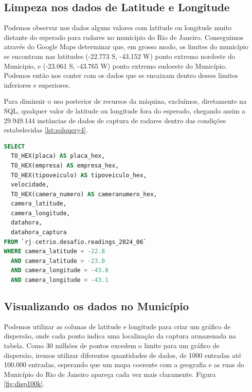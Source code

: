 \documentclass{article}
\begin{document}
\subsection{Limpeza nos dados de Latitude e Longitude}

Podemos observar nos dados alguns valores com latitude ou longitude muito distante do esperado para radares no município do Rio de Janeiro. Conseguimos através do Google Maps determinar que, em grosso modo, os limites do município se encontram nas latitudes (-22.773 S, -43.152 W) ponto extremo nordeste do Municipio, e (-23.061 S, -43.765 W) ponto extremo sudoeste do Município. Podemos então nos conter com os dados que se encaixam dentro desses limites inferiores e superiores.

Para diminuir o uso posterior de recursos da máquina, excluímos, diretamente na SQL, qualquer valor de latitude ou longitude fora do esperado, chegando assim a 29.949.144 instâncias  de  dados  de  captura  de  radares  dentro  das  condições  estabelecidas \ref{lst:sqlquery4}.

\begin{lstlisting}[language=SQL,caption={Query SQL para recuperar dados de radares dentro de um modelo retângular do Município do Rio de Janeiro},label={lst:sqlquery4}]
SELECT
  TO_HEX(placa) AS placa_hex,
  TO_HEX(empresa) AS empresa_hex,
  TO_HEX(tipoveiculo) AS tipoveiculo_hex,
  velocidade,
  TO_HEX(camera_numero) AS cameranumero_hex,
  camera_latitude,
  camera_longitude,
  datahora,
  datahora_captura
FROM `rj-cetrio.desafio.readings_2024_06`
WHERE camera_latitude < -22.8
  AND camera_latitude > -23.0
  AND camera_longitude > -43.8
  AND camera_longitude < -43.1
\end{lstlisting}


\subsection{Visualizando os dados no Município}

Podemos utilizar as colunas de latitude e longitude para criar um gráfico de dispersão, onde cada ponto indica uma localização da captura armazenada na tabela. Como 30 milhões de pontos excedem o limite para um gráfico de dispersão, iremos utilizar diferentes quantidades de dados, de 1000 entradas até 100.000 entradas, esperando que um mapa coerente com a geografia e as ruas do Município do Rio de Janeiro apareça cada vez mais claramente. Figura \ref{fig:disp100k}.
\end{document}
